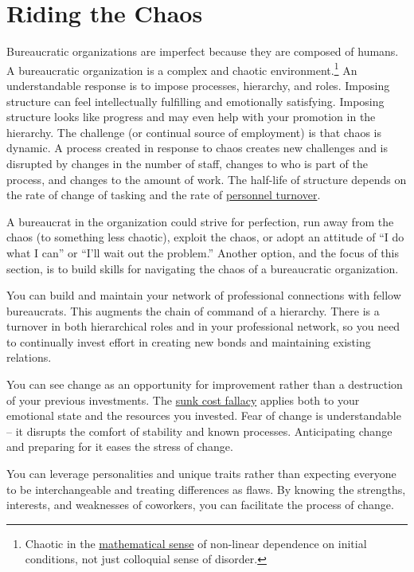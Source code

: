 \section{Riding the Chaos\label{sec:process-chaos}}

Bureaucratic organizations are imperfect because they are composed of humans. %
A bureaucratic organization is a complex and chaotic environment.\footnote{Chaotic in the \href{https://en.wikipedia.org/wiki/Chaos_theory}{mathematical sense} 
of non-linear dependence on initial conditions, not just colloquial sense of disorder.} An understandable response is to impose processes, hierarchy, and roles. Imposing structure can feel intellectually fulfilling and emotionally satisfying. Imposing structure looks like progress and may even help with your promotion in the hierarchy. The challenge (or continual source of employment) is that chaos is dynamic. A process created in response to chaos creates new challenges and is disrupted by changes in the number of staff, changes to who is part of the process, and changes to the amount of work. The half-life of structure depends on the rate of change of tasking and the rate of 
%
\hyperref[sec:turnover]{personnel turnover}.

A bureaucrat in the organization could strive for perfection, run away from the chaos (to something less chaotic), exploit the chaos, or adopt an attitude of ``I do what I can'' or ``I'll wait out the problem.'' 
Another option, and the focus of this section, is to build skills for navigating the chaos of a bureaucratic organization.

You can build and maintain your network of professional connections with fellow bureaucrats. 
%
%
This augments the chain of command of a hierarchy. There is a turnover in both hierarchical roles and in your professional network, so you need to continually invest effort in creating new bonds and maintaining existing relations. 

You can see change as an opportunity for improvement rather than a destruction of your previous investments. The \href{https://en.wikipedia.org/wiki/Sunk_cost}{sunk cost fallacy}
applies both to your emotional state and the resources you invested. Fear of change is understandable -- it disrupts the comfort of stability and known processes. Anticipating change and preparing for it eases the stress of change.

You can leverage personalities and unique traits rather than expecting everyone to be interchangeable and treating differences as flaws. 
By knowing the strengths, interests, and weaknesses of coworkers, you can facilitate the process of change. 